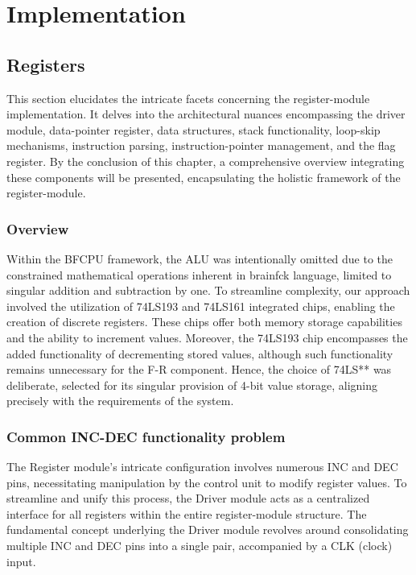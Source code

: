 \section{Implementation} \label{sec:implementation}
\subsection{Registers} \label{sec:implementation:registers}
This section elucidates the intricate facets concerning the register-module implementation. It delves into the architectural nuances encompassing the driver module, data-pointer register, data structures, stack functionality, loop-skip mechanisms, instruction parsing, instruction-pointer management, and the flag register. By the conclusion of this chapter, a comprehensive overview integrating these components will be presented, encapsulating the holistic framework of the register-module.

\subsubsection{Overview}
Within the BFCPU framework, the ALU was intentionally omitted due to the constrained mathematical operations inherent in brainfck language, limited to singular addition and subtraction by one. To streamline complexity, our approach involved the utilization of 74LS193 and 74LS161 integrated chips, enabling the creation of discrete registers. These chips offer both memory storage capabilities and the ability to increment values. Moreover, the 74LS193 chip encompasses the added functionality of decrementing stored values, although such functionality remains unnecessary for the F-R component. Hence, the choice of 74LS** was deliberate, selected for its singular provision of 4-bit value storage, aligning precisely with the requirements of the system.

\subsubsection{Common INC-DEC functionality problem}
The Register module's intricate configuration involves numerous INC and DEC pins, necessitating manipulation by the control unit to modify register values. To streamline and unify this process, the Driver module acts as a centralized interface for all registers within the entire register-module structure. The fundamental concept underlying the Driver module revolves around consolidating multiple INC and DEC pins into a single pair, accompanied by a CLK (clock) input.

